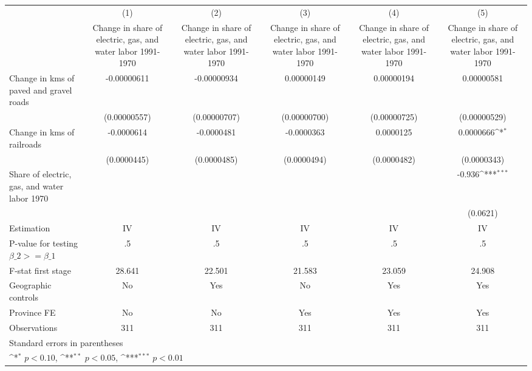 {
\def\sym#1{\ifmmode^{#1}\else\(^{#1}\)\fi}
\begin{tabular}{l*{5}{c}}
\hline\hline
                    &\multicolumn{1}{c}{(1)}&\multicolumn{1}{c}{(2)}&\multicolumn{1}{c}{(3)}&\multicolumn{1}{c}{(4)}&\multicolumn{1}{c}{(5)}\\
                    &\multicolumn{1}{c}{Change in share of electric, gas, and water labor 1991-1970}&\multicolumn{1}{c}{Change in share of electric, gas, and water labor 1991-1970}&\multicolumn{1}{c}{Change in share of electric, gas, and water labor 1991-1970}&\multicolumn{1}{c}{Change in share of electric, gas, and water labor 1991-1970}&\multicolumn{1}{c}{Change in share of electric, gas, and water labor 1991-1970}\\
\hline
Change in kms of paved and gravel roads& -0.00000611         & -0.00000934         &  0.00000149         &  0.00000194         &  0.00000581         \\
                    &(0.00000557)         &(0.00000707)         &(0.00000700)         &(0.00000725)         &(0.00000529)         \\
[1em]
Change in kms of railroads&  -0.0000614         &  -0.0000481         &  -0.0000363         &   0.0000125         &   0.0000666\sym{*}  \\
                    & (0.0000445)         & (0.0000485)         & (0.0000494)         & (0.0000482)         & (0.0000343)         \\
[1em]
Share of electric, gas, and water labor 1970&                     &                     &                     &                     &      -0.936\sym{***}\\
                    &                     &                     &                     &                     &    (0.0621)         \\
\hline
Estimation          &          IV         &          IV         &          IV         &          IV         &          IV         \\
P-value for testing $\beta\_2 >= \beta\_1$&          .5         &          .5         &          .5         &          .5         &          .5         \\
F-stat first stage  &      28.641         &      22.501         &      21.583         &      23.059         &      24.908         \\
Geographic controls &          No         &         Yes         &          No         &         Yes         &         Yes         \\
Province FE         &          No         &          No         &         Yes         &         Yes         &         Yes         \\
Observations        &         311         &         311         &         311         &         311         &         311         \\
\hline\hline
\multicolumn{6}{l}{\footnotesize Standard errors in parentheses}\\
\multicolumn{6}{l}{\footnotesize \sym{*} \(p<0.10\), \sym{**} \(p<0.05\), \sym{***} \(p<0.01\)}\\
\end{tabular}
}
